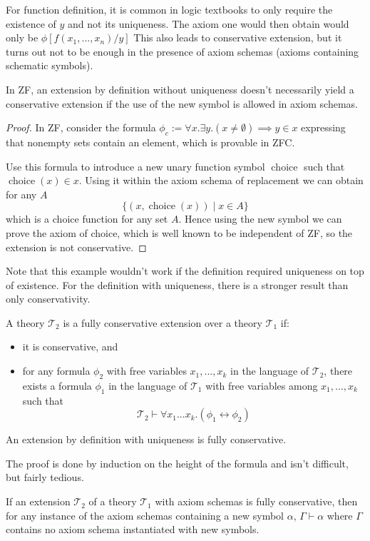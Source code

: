For function definition, it is common in logic textbooks to only require the existence of $y$ and not its uniqueness. The axiom one would then obtain would only be $\phi[f(x_1,...,x_n)/y]$ This also leads to conservative extension, but it turns out not to be enough in the presence of axiom schemas (axioms containing schematic symbols).
\begin{lemma}
In ZF, an extension by definition without uniqueness doesn't necessarily yield a conservative extension if the use of the new symbol is allowed in axiom schemas.
\end{lemma}
\begin{proof}
In ZF, consider the formula $\phi_c := \forall x. \exists y. (x \neq \emptyset) \implies y \in x$ expressing that nonempty sets contain an element, which is provable in ZFC.

Use this formula to introduce a new unary function symbol $\operatorname{choice}$ such that $\operatorname{choice}(x) \in x$. Using it within the axiom schema of replacement we can obtain for any $A$
$$
\lbrace (x, \operatorname{choice}(x)) \mid x \in A \rbrace
$$
which is a choice function for any set $A$. Hence using the new symbol we can prove the axiom of choice, which is well known to be independent of ZF, so the extension is not conservative.
\end{proof}
Note that this example wouldn't work if the definition required uniqueness on top of existence.
For the definition with uniqueness, there is a stronger result than only conservativity.
\begin{defin}
A theory $\mathcal{T}_2$ is a fully conservative extension over a theory $\mathcal{T}_1$ if:
\begin{itemize}
\item it is conservative, and
\item for any formula $\phi_2$ with free variables $x_1, ..., x_k$ in the language of $\mathcal{T}_2$, there exists a formula $\phi_1$ in the language of $\mathcal{T}_1$ with free variables among $x_1, ..., x_k$ such that
$$\mathcal{T}_2 \vdash \forall x_1...x_k. (\phi_1 \leftrightarrow \phi_2)$$
\end{itemize}
\end{defin}
\begin{thm}
An extension by definition with uniqueness is fully conservative.
\end{thm}
The proof is done by induction on the height of the formula and isn't difficult, but fairly tedious.
\begin{thm}
If an extension $\mathcal{T}_2$ of a theory $\mathcal{T}_1$ with axiom schemas is fully conservative, then for any instance of the axiom schemas containing a new symbol $\alpha$, $\Gamma \vdash \alpha$ where $\Gamma$ contains no axiom schema instantiated with new symbols.

\end{thm}
